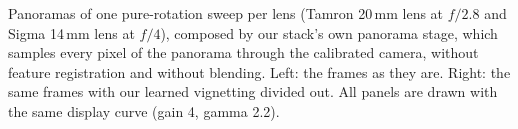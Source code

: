 Panoramas of one pure-rotation sweep per lens (Tamron 20\,mm lens at $f/2.8$ and Sigma 14\,mm lens at $f/4$), composed by our stack's own panorama stage, which samples every pixel of the panorama through the calibrated camera, without feature registration and without blending. Left: the frames as they are. Right: the same frames with our learned vignetting divided out. All panels are drawn with the same display curve (gain 4, gamma 2.2).

